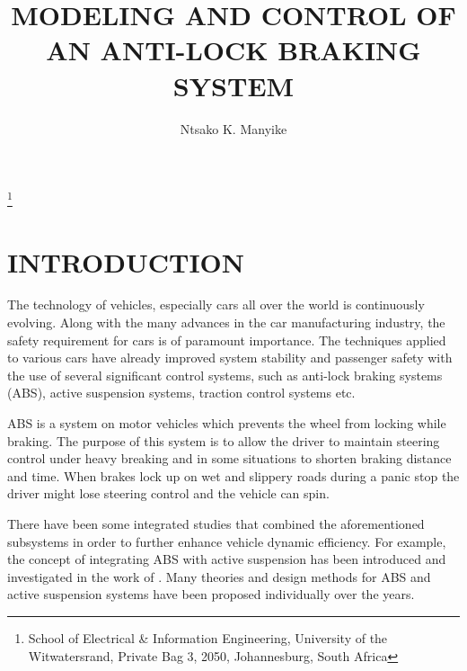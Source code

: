 \documentclass[10pt,twocolumn]{witseiepaper}
\begin{document}
\title{MODELING AND CONTROL OF AN ANTI-LOCK BRAKING SYSTEM}

\author{Ntsako K. Manyike}

\thanks{School of Electrical \& Information Engineering, University of the
Witwatersrand, Private Bag 3, 2050, Johannesburg, South Africa}



%



\maketitle
\thispagestyle{empty}\pagestyle{empty}


%
\section{INTRODUCTION}

The technology of vehicles, especially cars all over the world is continuously evolving. Along with the many advances in the car manufacturing industry, the safety requirement for cars is of paramount importance. The techniques applied to various cars have already improved system stability and passenger safety with the use of several significant control systems, such as anti-lock braking systems (ABS), active suspension systems, traction control systems etc. 

ABS is a system on motor vehicles which prevents the wheel from locking while braking. The purpose of this system is to allow the driver to maintain steering control under heavy breaking and in some situations to shorten braking distance and time. When brakes lock up on wet and slippery roads during a panic stop the driver might lose steering control and the vehicle can spin.

There have been some integrated studies that combined the aforementioned subsystems in order to further enhance vehicle dynamic efficiency. For example, the concept of integrating ABS with active suspension has been introduced and investigated in the work of \cite{Alleyne:1997}. Many theories and design methods for ABS and active suspension systems have been proposed individually over the years. 
\end{document}

